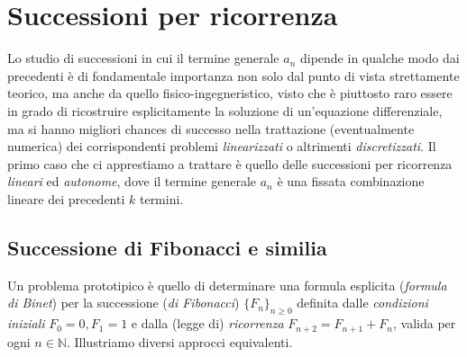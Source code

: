 \documentclass[a4paper,twoside]{article}
\newcommand{\N}{\mathbb{N}}
\theoremstyle{definition}
\numberwithin{theorem}{section}
\begin{document}
\section{Successioni per ricorrenza}
Lo studio di successioni in cui il termine generale $a_n$ dipende in qualche modo dai precedenti è di fondamentale importanza non solo dal punto di vista strettamente teorico, ma anche da quello fisico-ingegneristico, visto che è piuttosto raro essere in grado di ricostruire esplicitamente la soluzione di un'equazione differenziale, ma si hanno migliori chances di successo nella trattazione (eventualmente numerica) dei corrispondenti problemi \emph{linearizzati} o altrimenti \emph{discretizzati}. Il primo caso che ci apprestiamo a trattare è quello delle successioni per ricorrenza \emph{lineari} ed \emph{autonome}, dove il termine generale $a_n$ è una fissata combinazione lineare dei precedenti $k$ termini.

\subsection{Successione di Fibonacci e similia}
Un problema prototipico è quello di determinare una formula esplicita (\emph{formula di Binet}) per la successione (\emph{di Fibonacci}) $\{F_n\}_{n\geq 0}$ definita dalle \emph{condizioni iniziali} $F_0=0, F_1=1$ e dalla (legge di) \emph{ricorrenza} $F_{n+2}=F_{n+1}+F_n$, valida per ogni $n\in\N$. Illustriamo diversi approcci equivalenti.\\
\end{document}
